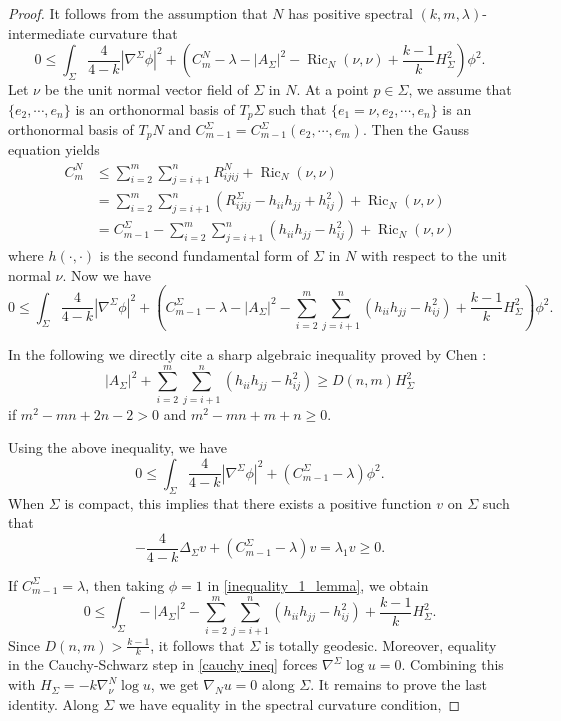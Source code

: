 \documentclass[11pt]{amsart}
\DeclareMathOperator{\Ric}{Ric}
\theoremstyle{definition}
\theoremstyle{remark}
\numberwithin{equation}{section}
\begin{document}
\begin{proof}
    It follows from the assumption that $N$ has positive spectral $(k,m,\lambda)$-intermediate
      curvature that
    \begin{equation*}
        0\leq\int_\Sigma
          \frac{4}{4-k}|\nabla^\Sigma\phi|^2+(C_m^N-\lambda-|A_\Sigma|^2-\Ric_N(\nu,\nu)+\frac{k-1}{k}H_{\Sigma}^2)\phi^2.
    \end{equation*}
    Let $\nu$ be the unit normal vector field of $\Sigma$ in $N$. At a point $p\in \Sigma$, we
      assume that $\{e_2,\cdots,e_n\}$ is an  orthonormal basis of $T_p\Sigma$ such that
      $\{e_1=\nu,e_2,\cdots,e_n\}$ is an orthonormal basis of $T_pN$ and
      $C_{m-1}^\Sigma=C_{m-1}^\Sigma(e_2,\cdots,e_m).$ Then the Gauss equation yields
\begin{align*}
    C_m^N&\leq \sum_{i=2}^{m}\sum_{j=i+1}^n R^N_{ijij}+\Ric_N(\nu,\nu)\\
    &=\sum_{i=2}^{m}\sum_{j=i+1}^n (R^\Sigma_{ijij}-h_{ii}h_{jj}+h_{ij}^2)+\Ric_N(\nu,\nu)\\
      &=C^\Sigma_{m-1}-\sum_{i=2}^{m}\sum_{j=i+1}^n (h_{ii}h_{jj}-h_{ij}^2)+\Ric_N(\nu,\nu)
\end{align*}   
where $h(\cdot,\cdot)$ is the second fundamental form of $\Sigma$ in $N$ with respect to the unit
  normal $\nu$. Now we have
\begin{equation}\label{inequality_1_lemma}
0\leq \int_\Sigma
  \frac{4}{4-k}|\nabla^\Sigma\phi|^2+\left(C_{m-1}^\Sigma-\lambda-|A_\Sigma|^2-\sum_{i=2}^{m}\sum_{j=i+1}^n (h_{ii}h_{jj}-h_{ij}^2)+\frac{k-1}{k}H_{\Sigma}^2\right)\phi^2.
\end{equation}

In the following we directly cite a sharp algebraic inequality proved by Chen \cite[Lemma
  5.8]{chenshuli_end}:
\[|A_\Sigma|^2+\sum_{i=2}^{m}\sum_{j=i+1}^n (h_{ii}h_{jj}-h_{ij}^2)\geq D(n,m)H_\Sigma^2\]
if $m^2-mn+2n-2>0$ and $m^2-mn+m+n\geq 0$.


Using the above inequality, we have
\[0\leq\int_\Sigma \frac{4}{4-k}|\nabla^\Sigma\phi|^2+(C_{m-1}^\Sigma-\lambda)\phi^2.\]
When $\Sigma$ is compact, this implies that there exists a positive function $v$ on $\Sigma$ such that
\[-\frac{4}{4-k}\Delta_\Sigma v+(C^\Sigma_{m-1}-\lambda)v=\lambda_1 v\geq 0.\]

If $C_{m-1}^{\Sigma}=\lambda$, then taking $\phi=1$ in \eqref{inequality_1_lemma}, we obtain
\[
0\leq \int_\Sigma -|A_\Sigma|^2-\sum_{i=2}^{m}\sum_{j=i+1}^n
  (h_{ii}h_{jj}-h_{ij}^2)+\frac{k-1}{k}H_{\Sigma}^2.
\]
Since $D(n,m)>\frac{k-1}{k}$, it follows that $\Sigma$ is totally geodesic.
Moreover, equality in the Cauchy-Schwarz step in \eqref{cauchy ineq} forces
  $\nabla^{\Sigma}\log u=0$. Combining this with
  $H_{\Sigma}=-k\nabla_{\nu}^{N}\log u$, we get $\nabla_{N}u=0$ along $\Sigma$.
It remains to prove the last identity.  Along $\Sigma$ we have equality in the spectral curvature condition,


\end{proof}
\end{document}
